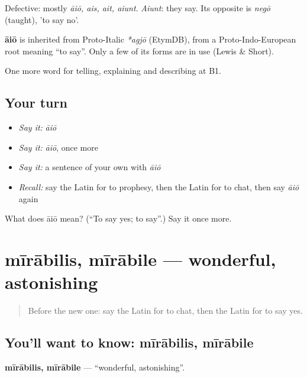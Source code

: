 Defective: mostly \emph{āiō, ais, ait, aiunt}. \emph{Aiunt}: they say. Its opposite is \emph{negō} (taught), 'to say no'.

\begin{cousinweb}
\textbf{āiō} is inherited from Proto-Italic \emph{*agjō} (EtymDB), from a Proto-Indo-European root meaning \textquotedblleft{}to say\textquotedblright{}. Only a few of its forms are in use (Lewis \& Short).
\end{cousinweb}

\begin{grammarlens}[title={What you've built}]
One more word for telling, explaining and describing at B1.
\end{grammarlens}

\subsection*{Your turn}
\begin{itemize}
\raggedright
  \item \emph{Say it:} \emph{āiō}
  \item \emph{Say it:} \emph{āiō}, once more
  \item \emph{Say it:} a sentence of your own with \emph{āiō}
  \item \emph{Recall:} say the Latin for to prophesy, then the Latin for to chat, then say \emph{āiō} again
\end{itemize}

\begin{tcolorbox}[breakable,colback=teal!4,colframe=teal!35!black,title={Before you move on}]
What does āiō mean? (\textquotedblleft{}To say yes; to say\textquotedblright{}.) Say it once more.
\end{tcolorbox}
\section[mīrābilis, mīrābile]{mīrābilis, mīrābile — wonderful, astonishing}

\label{lesson:LA-C349-mirabilis}



\begin{quote}
Before the new one: say the Latin for to chat, then the Latin for to say yes.
\end{quote}

\subsection*{You'll want to know: mīrābilis, mīrābile}
\textbf{mīrābilis, mīrābile} — \textquotedblleft{}wonderful, astonishing\textquotedblright{}.

